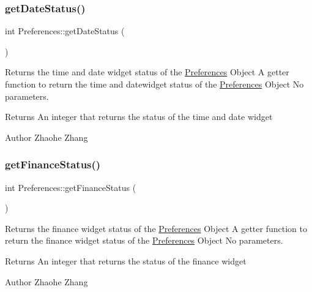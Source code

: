 \subsubsection{\texorpdfstring{get\+Date\+Status()}{getDateStatus()}}
{\footnotesize\ttfamily int Preferences\+::get\+Date\+Status (\begin{DoxyParamCaption}{ }\end{DoxyParamCaption})}



Returns the time and date widget status of the \mbox{\hyperlink{class_preferences}{Preferences}} Object  A getter function to return the time and datewidget status of the \mbox{\hyperlink{class_preferences}{Preferences}} Object  No parameters. 

\begin{DoxyReturn}{Returns}
An integer that returns the status of the time and date widget 
\end{DoxyReturn}
\begin{DoxyAuthor}{Author}
Zhaohe Zhang 
\end{DoxyAuthor}
\mbox{\label{class_preferences_a9c1c270a1e37321e6eb9b5eb90a91aba}} 
\subsubsection{\texorpdfstring{get\+Finance\+Status()}{getFinanceStatus()}}
{\footnotesize\ttfamily int Preferences\+::get\+Finance\+Status (\begin{DoxyParamCaption}{ }\end{DoxyParamCaption})}



Returns the finance widget status of the \mbox{\hyperlink{class_preferences}{Preferences}} Object  A getter function to return the finance widget status of the \mbox{\hyperlink{class_preferences}{Preferences}} Object  No parameters. 

\begin{DoxyReturn}{Returns}
An integer that returns the status of the finance widget 
\end{DoxyReturn}
\begin{DoxyAuthor}{Author}
Zhaohe Zhang 
\end{DoxyAuthor}
\mbox{\label{class_preferences_a2496f5889a605786bfd0971a421ce70b}} 
